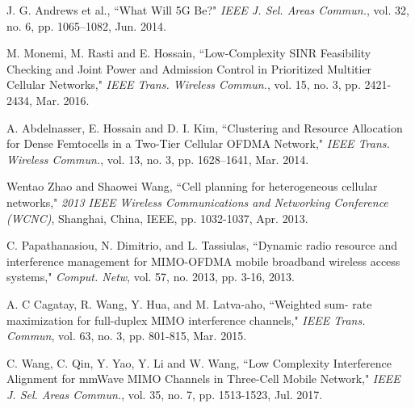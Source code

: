 \documentclass[journal]{IEEEtran}
\begin{document}

%
%
%
\begin{thebibliography}{1}

J. G. Andrews et al., ``What Will 5G Be?" \textit{IEEE J. Sel. Areas Commun.}, vol. 32, no. 6, pp. 1065–1082, Jun. 2014.

M. Monemi, M. Rasti and E. Hossain, ``Low-Complexity SINR Feasibility Checking and Joint Power and Admission Control in 
Prioritized Multitier Cellular Networks," \textit{IEEE Trans. Wireless Commun.}, vol. 15, no. 3, pp. 2421-2434, Mar. 2016. 

A. Abdelnasser, E. Hossain and D. I. Kim, ``Clustering and Resource Allocation for Dense Femtocells in a Two-Tier Cellular OFDMA Network," \textit{IEEE Trans. Wireless Commun.}, vol. 13, no. 3, pp. 1628–1641, Mar. 2014. 

Wentao Zhao and Shaowei Wang, ``Cell planning for heterogeneous cellular networks," \textit{2013 IEEE Wireless Communications and Networking Conference (WCNC)}, Shanghai, China, IEEE, pp. 1032-1037, Apr. 2013.

C. Papathanasiou, N. Dimitrio, and L. Tassiulas, ``Dynamic radio resource and interference management for MIMO-OFDMA mobile broadband wireless access systems," \textit{Comput. Netw}, vol. 57, no. 2013, pp. 3-16, 2013.

A. C Cagatay, R. Wang, Y. Hua, and M. Latva-aho, ``Weighted sum- rate maximization for full-duplex MIMO interference channels," \textit{IEEE Trans. Commun}, vol. 63, no. 3, pp. 801-815, Mar. 2015.



C. Wang, C. Qin, Y. Yao, Y. Li and W. Wang, ``Low Complexity Interference Alignment for mmWave MIMO Channels in Three-Cell Mobile Network," \textit{IEEE J. Sel. Areas Commun.}, vol. 35, no. 7, pp. 1513-1523, Jul. 2017. 


\end{thebibliography}
\end{document}
